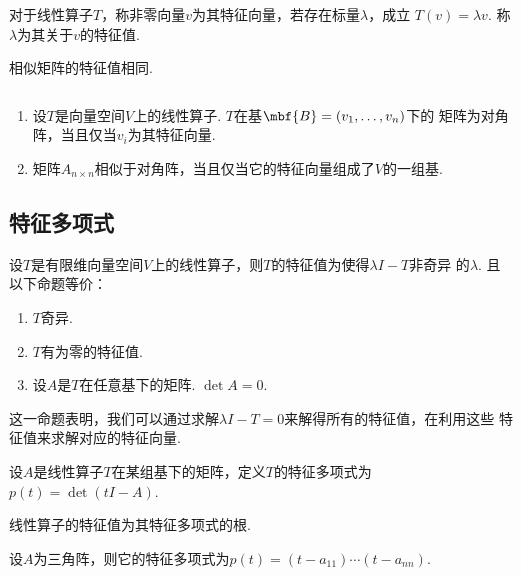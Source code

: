   \begin{defi}[特征向量]
    对于线性算子$T$，称非零向量$v$为其特征向量，若存在标量$\lambda$，成立
    $T(v)=\lambda v$. 称$\lambda$为其关于$v$的特征值.
  \end{defi}

  \begin{thm}
    相似矩阵的特征值相同.
  \end{thm}

  \begin{thm}
    $\,$
    \begin{enumerate}
      \item 设$T$是向量空间$V$上的线性算子. $T$在基$\mbf{B}=(v_1,\dots,v_n)$下的
        矩阵为对角阵，当且仅当$v_i$为其特征向量.
      \item 矩阵$A_{n\times n}$相似于对角阵，当且仅当它的特征向量组成了$V$的一组基.
    \end{enumerate}
  \end{thm}

\subsection{特征多项式}

  \begin{thm}
    设$T$是有限维向量空间$V$上的线性算子，则$T$的特征值为使得$\lambda I-T$非奇异
    的$\lambda$. 且以下命题等价：
    \begin{enumerate}
      \item $T$奇异.
      \item $T$有为零的特征值.
      \item 设$A$是$T$在任意基下的矩阵. $\det A=0$.
    \end{enumerate}
  \end{thm}
  \remark
    这一命题表明，我们可以通过求解$\lambda I - T=0$来解得所有的特征值，在利用这些
    特征值来求解对应的特征向量.

  \begin{defi}[特征多项式]
    设$A$是线性算子$T$在某组基下的矩阵，定义$T$的特征多项式为$p(t)=\det(tI-A)$.
  \end{defi}

  \begin{cor}
    线性算子的特征值为其特征多项式的根.
  \end{cor}

  \begin{cor}
    设$A$为三角阵，则它的特征多项式为$p(t)=(t-a_{11})\cdots(t-a_{nn})$.
  \end{cor}


